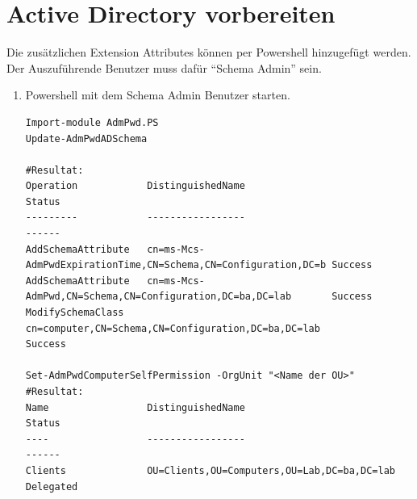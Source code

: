 \section{Active Directory vorbereiten}
Die zusätzlichen Extension Attributes können per Powershell hinzugefügt werden.
Der Auszuführende Benutzer muss dafür ``Schema Admin'' sein.

\begin{enumerate}
    \item Powershell mit dem Schema Admin Benutzer starten.
    \begin{lstlisting}
Import-module AdmPwd.PS
Update-AdmPwdADSchema

#Resultat:
Operation            DistinguishedName                                              Status
---------            -----------------                                              ------
AddSchemaAttribute   cn=ms-Mcs-AdmPwdExpirationTime,CN=Schema,CN=Configuration,DC=b Success
AddSchemaAttribute   cn=ms-Mcs-AdmPwd,CN=Schema,CN=Configuration,DC=ba,DC=lab       Success
ModifySchemaClass    cn=computer,CN=Schema,CN=Configuration,DC=ba,DC=lab            Success

Set-AdmPwdComputerSelfPermission -OrgUnit "<Name der OU>"
#Resultat:
Name                 DistinguishedName                                              Status
----                 -----------------                                              ------
Clients              OU=Clients,OU=Computers,OU=Lab,DC=ba,DC=lab                    Delegated
    \end{lstlisting}

\end{enumerate}

%
%
%

%
%
%
%
%
%
%
%
%